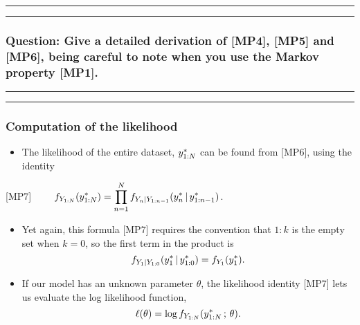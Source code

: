 \documentclass[]{article}
\providecommand{\tightlist}{%
  \setlength{\itemsep}{0pt}\setlength{\parskip}{0pt}}
\begin{document}
\begin{center}\rule{0.5\linewidth}{\linethickness}\end{center}

\begin{center}\rule{0.5\linewidth}{\linethickness}\end{center}

\subsubsection{Question: Give a detailed derivation of {[}MP4{]},
{[}MP5{]} and {[}MP6{]}, being careful to note when you use the Markov
property
{[}MP1{]}.}\label{question-give-a-detailed-derivation-of-mp4-mp5-and-mp6-being-careful-to-note-when-you-use-the-markov-property-mp1.}

\begin{center}\rule{0.5\linewidth}{\linethickness}\end{center}

\begin{center}\rule{0.5\linewidth}{\linethickness}\end{center}

\subsubsection{Computation of the
likelihood}\label{computation-of-the-likelihood}

\begin{itemize}
\tightlist
\item
  The likelihood of the entire dataset, \(y_{1:N}^*\) can be found
  from {[}MP6{]}, using the identity
\end{itemize}

{[}MP7{]}
\(\quad\quad\displaystyle f_{Y_{1:N}}(y_{1:N}^*) = \prod_{n=1}^N f_{Y_{n}|Y_{1:n-1}}(y_n^*{\, | \,} y_{1:n-1}^*)\).

\begin{itemize}
\item
  Yet again, this formula {[}MP7{]} requires the convention that \(1:k\)
  is the empty set when \(k=0\), so the first term in the product is
  \[f_{Y_{1}|Y_{1:0}}(y_1^*{\, | \,} y_{1:0}^*) = 
  f_{Y_{1}}(y_1^*).\]
\item
  If our model has an unknown parameter \(\theta\), the likelihood
  identity {[}MP7{]} lets us evaluate the log likelihood function,
  \[\ell(\theta)=\log f_{Y_{1:N}}(y_{1:N}^*\, ; \,\theta).\]
\end{itemize}
\end{document}
